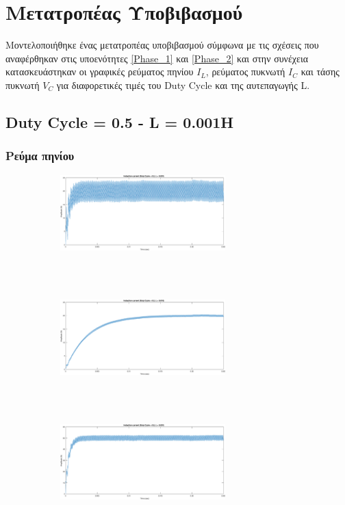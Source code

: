 \section{Μετατροπέας Υποβιβασμού}
Μοντελοποιήθηκε ένας μετατροπέας υποβιβασμού σύμφωνα με τις σχέσεις που αναφέρθηκαν στις υποενότητες \ref{Phase_1} και \ref{Phase_2} και στην συνέχεια κατασκευάστηκαν οι γραφικές ρεύματος πηνίου $I_L$, ρεύματος πυκνωτή $I_C$ και τάσης πυκνωτή $V_C$ για διαφορετικές τιμές του Duty Cycle και της αυτεπαγωγής L.

\subsection{Duty Cycle = 0.5  -  L = 0.001H}

\subsubsection{Ρεύμα πηνίου}
\begin{figure}[h!]
	\begin{subfigure}{\textwidth}
		\centering
		\includegraphics[width=0.7\textwidth]{Images/I_L_05_1}
	\end{subfigure}
	\\\\
	\begin{subfigure}{\textwidth}
		\centering
		\includegraphics[width=0.7\textwidth]{Images/I_L_05_10}
	\end{subfigure}
	\\\\
	\begin{subfigure}{\textwidth}
		\centering
		\includegraphics[width=0.7\textwidth]{Images/I_L_08_1}
	\end{subfigure}
\end{figure}
